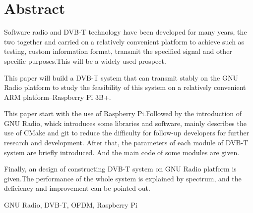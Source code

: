 ﻿%
\renewcommand{\baselinestretch}{1.5}
\fontsize{12pt}{13pt}\selectfont

\chapter*{Abstract}

\par Software radio and DVB-T technology have been developed for many years, the two together and carried on a relatively convenient platform to achieve such as testing, custom information format, transmit the specified signal and other specific purposes.This will be a widely used prospect.
\par This paper will build a DVB-T system that can transmit stably on the GNU Radio platform to study the feasibility of this system on a relatively convenient ARM platform--Raspberry Pi 3B+.
\par This paper start with the use of Raspberry Pi.Followed by the introduction of GNU Radio, whick introduces some libraries and software, mainly describes the use of CMake and git to reduce the difficulty for follow-up developers for further research and development. After that, the parameters of each module of DVB-T system are briefly introduced. And the main code of some modules are given. 
\par Finally, an design of constructing DVB-T system on GNU Radio platform is given.The performance of the whole system is explained by spectrum, and the deficiency and improvement can be pointed out.


\vspace{1em}
 \quad GNU Radio, DVB-T, OFDM, Raspberry Pi

\clearpage
\endinput